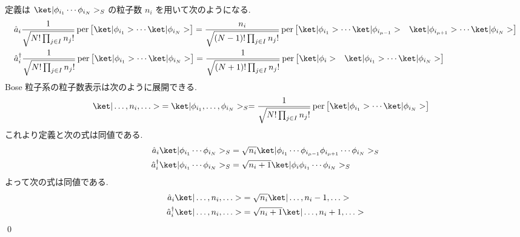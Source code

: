 \documentclass[uplatex,dvipdfmx,a4paper,11pt]{jlreq}
\makeatletter
\DeclareMathOperator{\per}{per}
\numberwithin{equation}{section}
\theoremstyle{definition}
\renewenvironment{proof}[1][\proofname]{\par
  \normalfont
  \topsep6\p@\@plus6\p@ \trivlist
  \item[\hskip\labelsep{\bfseries #1}\@addpunct{\bfseries}]\ignorespaces\quad\par
}{%
  \qed\endtrivlist\@endpefalse
}
\renewcommand\proofname{証明}
\makeatother
\begin{document}
\begin{proof}
  定義は $\ket|\phi_{i_1}\cdots\phi_{i_N}>_S$ の粒子数 $n_i$ を用いて次のようになる.
  \begin{align}
     & \hat{a}_i\frac{1}{\sqrt{N!\prod_{j\in I}n_j!}}\per\begin{bmatrix}\ket|\phi_{i_1}> \cdots \ket|\phi_{i_N}>\end{bmatrix} = \frac{n_i}{\sqrt{(N-1)!\prod_{j\in I}n_j!}}\per\begin{bmatrix}\ket|\phi_{i_1}> \cdots \ket|\phi_{i_{\mu - 1}}> & \ket|\phi_{i_{\mu + 1}}> \cdots \ket|\phi_{i_N}>\end{bmatrix} \\
     & \hat{a}_i^\dagger\frac{1}{\sqrt{N!\prod_{j\in I}n_j!}}\per\begin{bmatrix}\ket|\phi_{i_1}> \cdots \ket|\phi_{i_N}>\end{bmatrix} = \frac{1}{\sqrt{(N+1)!\prod_{j\in I}n_j!}}\per\begin{bmatrix}\ket|\phi_{i}> & \ket|\phi_{i_1}> \cdots \ket|\phi_{i_N}>\end{bmatrix}
  \end{align}
  Bose 粒子系の粒子数表示は次のように展開できる.
  \begin{align}
    \ket|\ldots,n_i,\ldots> & = \ket|\phi_{i_1},\ldots,\phi_{i_N}>_S = \frac{1}{\sqrt{N!\prod_{j\in I}n_j!}}\per\begin{bmatrix}\ket|\phi_{i_1}>\cdots\ket|\phi_{i_N}>\end{bmatrix}
  \end{align}
  これより定義と次の式は同値である.
  \begin{align}
    \hat{a}_i\ket|\phi_{i_1}\cdots\phi_{i_N}>_S         & = \sqrt{n_i}\ket|\phi_{i_1}\cdots\phi_{i_{\mu - 1}}\phi_{i_{\mu + 1}}\cdots\phi_{i_N}>_S \\
    \hat{a}_i^\dagger\ket|\phi_{i_1}\cdots\phi_{i_N}>_S & = \sqrt{n_i+1}\ket|\phi_{i} \phi_{i_1}\cdots\phi_{i_N}>_S
  \end{align}
  よって次の式は同値である.
  \begin{align}
    \hat{a}_i\ket|\ldots,n_i,\ldots>         & = \sqrt{n_i}\ket|\ldots,n_i-1,\ldots>     \\
    \hat{a}_i^\dagger\ket|\ldots,n_i,\ldots> & = \sqrt{n_i + 1}\ket|\ldots,n_i+1,\ldots>
  \end{align}
\end{proof}
\end{document}
